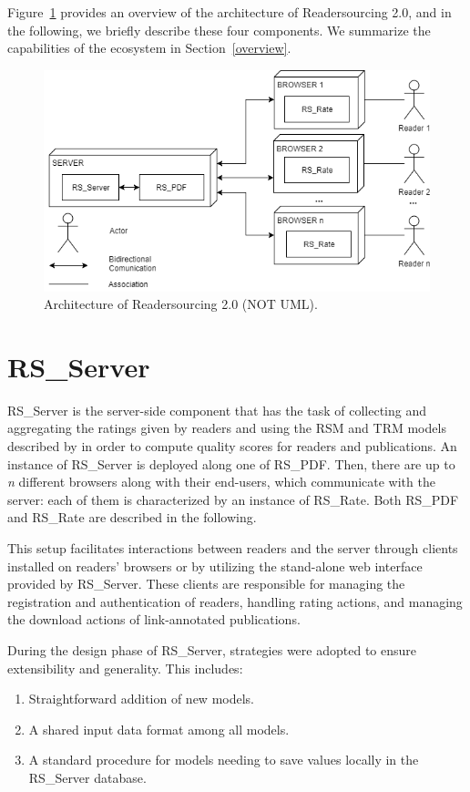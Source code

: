 \documentclass[a4paper, english]{article}
\newcommand{\rsserver}{RS\_Server\xspace}
\newcommand{\rspdf}{RS\_PDF\xspace}
\newcommand{\rsrate}{RS\_Rate\xspace}
\begin{document}
Figure~\ref{fig:architecture} provides an overview of the architecture of Readersourcing 2.0, and in the following, we briefly describe these four components. We summarize the capabilities of the ecosystem in Section~\ref{overview}.

\begin{figure}[h]
\centering
\includegraphics[width=\textwidth]{figures/architecture.png}
\caption{Architecture of Readersourcing 2.0 (NOT UML).}
\label{fig:architecture}
\end{figure}

\section{\rsserver}

\label{rs-server}

\rsserver \cite{RS-Server} is the server-side component that has the task of collecting and aggregating the ratings given by readers and using the RSM and TRM models described by \citet{Soprano2019} in order to compute quality scores for readers and publications. An instance of \rsserver is deployed along one of \rspdf. 
Then, there are up to \emph{n} different browsers along with their end-users, which communicate with the server: each of them is characterized by an instance of \rsrate. Both \rspdf and \rsrate are described in the following.

This setup facilitates interactions between readers and the server through clients installed on readers' browsers or by utilizing the stand-alone web interface provided by \rsserver. These clients are responsible for managing the registration and authentication of readers, handling rating actions, and managing the download actions of link-annotated publications.

During the design phase of \rsserver, strategies were adopted to ensure extensibility and generality. This includes: 
\begin{enumerate}[label=(\roman*)]
\item Straightforward addition of new models. 
\item A shared input data format among all models.
\item A standard procedure for models needing to save values locally in the \rsserver database.
\end{enumerate}
\end{document}
